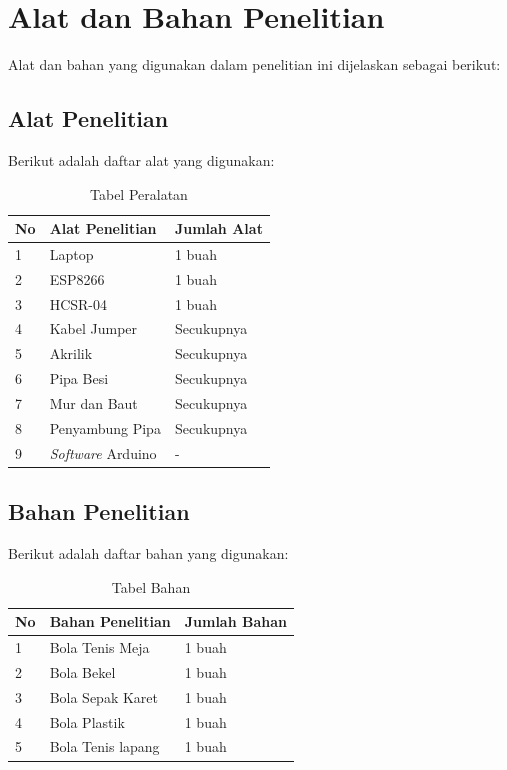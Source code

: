 \section{Alat dan Bahan Penelitian}
Alat dan bahan yang digunakan dalam penelitian ini dijelaskan sebagai berikut:

\subsection{Alat Penelitian}
Berikut adalah daftar alat yang digunakan:
\begin{table}[H]
\caption{Tabel Peralatan}
\label{tab:alat}
\begin{center}
    \begin{tabular}{|l|l|l|}
    \hline
        \textbf{No} & \textbf{Alat Penelitian} & \textbf{Jumlah Alat} \\\hline
        1 & Laptop & 1 buah \\\hline
        2 & ESP8266 & 1 buah \\\hline
        3 & HCSR-04 & 1 buah \\\hline
        4 & Kabel Jumper & Secukupnya \\\hline
        5 & Akrilik & Secukupnya \\\hline
        6 & Pipa Besi & Secukupnya \\\hline
        7 & Mur dan Baut & Secukupnya \\\hline
        8 & Penyambung Pipa & Secukupnya \\\hline
        9 & \textit{Software} Arduino & - \\\hline
    \end{tabular}
\end{center}
\end{table}

\subsection{Bahan Penelitian}
Berikut adalah daftar bahan yang digunakan:
\begin{table}[H]
\caption{Tabel Bahan}
\label{tab:bahan}
\begin{center}
    \begin{tabular}{|l|l|l|}
    \hline
        \textbf{No} & \textbf{Bahan Penelitian} & \textbf{Jumlah Bahan} \\\hline
        1 & Bola Tenis Meja & 1 buah \\\hline
        2 & Bola Bekel & 1 buah \\\hline
        3 & Bola Sepak Karet & 1 buah \\\hline
        4 & Bola Plastik & 1 buah \\\hline
        5 & Bola Tenis lapang & 1 buah \\\hline
    \end{tabular}
\end{center}
\end{table}

